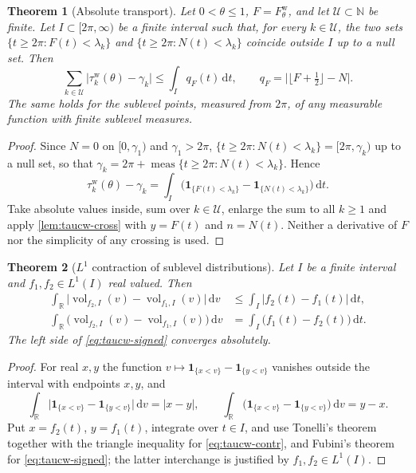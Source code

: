 \documentclass[11pt,a4paper]{article}
\numberwithin{equation}{section}
\newtheorem{theorem}{Theorem}[section]
\theoremstyle{definition}
\theoremstyle{remark}
\newcommand{\meas}{\operatorname{meas}}
\newcommand{\ind}{\mathbf 1}
\newcommand{\vol}{\operatorname{vol}}
\newcommand{\dd}{\,\mathrm dt}
\begin{document}
\begin{theorem}[Absolute transport]\label{thm:taucw-L1}
Let $0<\theta\le1$, $F=F^{\mathrm w}_\theta$, and let $\mathcal U\subset\mathbb N$ be finite. Let $I\subset[2\pi,\infty)$ be a finite interval such that, for every $k\in\mathcal U$, the two sets $\{t\ge2\pi:F(t)<\lambda_k\}$ and $\{t\ge2\pi:N(t)<\lambda_k\}$ coincide outside $I$ up to a null set. Then
\begin{equation}\label{eq:taucw-L1}
\sum_{k\in\mathcal U}\bigl|\tau_k^{\mathrm w}(\theta)-\gamma_k\bigr|\le\int_Iq_F(t)\dd,\qquad q_F=\bigl|\lfloor F+\tfrac12\rfloor-N\bigr|.
\end{equation}
The same holds for the sublevel points, measured from $2\pi$, of any measurable function with finite sublevel measures.
\end{theorem}
\begin{proof}
Since $N=0$ on $[0,\gamma_1)$ and $\gamma_1>2\pi$, $\{t\ge2\pi:N(t)<\lambda_k\}=[2\pi,\gamma_k)$ up to a null set, so that $\gamma_k=2\pi+\meas\{t\ge2\pi:N(t)<\lambda_k\}$. Hence
\begin{equation}
\tau_k^{\mathrm w}(\theta)-\gamma_k=\int_I\bigl(\ind_{\{F(t)<\lambda_k\}}-\ind_{\{N(t)<\lambda_k\}}\bigr)\dd.
\end{equation}
Take absolute values inside, sum over $k\in\mathcal U$, enlarge the sum to all $k\ge1$ and apply \cref{lem:taucw-cross} with $y=F(t)$ and $n=N(t)$. Neither a derivative of $F$ nor the simplicity of any crossing is used.
\end{proof}

\begin{theorem}[$L^1$ contraction of sublevel distributions]\label{thm:taucw-contr}
Let $I$ be a finite interval and $f_1,f_2\in L^1(I)$ real valued. Then
\begin{align}
\int_{\mathbb R}\bigl|\vol_{f_2,I}(v)-\vol_{f_1,I}(v)\bigr|\,\mathrm dv&\le\int_I|f_2(t)-f_1(t)|\dd,\label{eq:taucw-contr}\\
\int_{\mathbb R}\bigl(\vol_{f_2,I}(v)-\vol_{f_1,I}(v)\bigr)\,\mathrm dv&=\int_I\bigl(f_1(t)-f_2(t)\bigr)\dd.\label{eq:taucw-signed}
\end{align}
The left side of \eqref{eq:taucw-signed} converges absolutely.
\end{theorem}
\begin{proof}
For real $x,y$ the function $v\mapsto\ind_{\{x<v\}}-\ind_{\{y<v\}}$ vanishes outside the interval with endpoints $x,y$, and
\begin{equation}
\int_{\mathbb R}\bigl|\ind_{\{x<v\}}-\ind_{\{y<v\}}\bigr|\,\mathrm dv=|x-y|,\qquad
\int_{\mathbb R}\bigl(\ind_{\{x<v\}}-\ind_{\{y<v\}}\bigr)\,\mathrm dv=y-x.
\end{equation}
Put $x=f_2(t)$, $y=f_1(t)$, integrate over $t\in I$, and use Tonelli's theorem together with the triangle inequality for \eqref{eq:taucw-contr}, and Fubini's theorem for \eqref{eq:taucw-signed}; the latter interchange is justified by $f_1,f_2\in L^1(I)$.
\end{proof}
\end{document}
